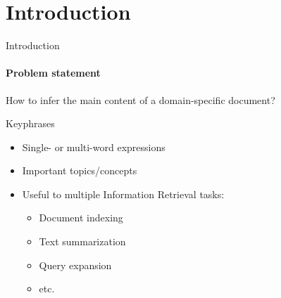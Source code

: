 \section*{Introduction}
\begin{frame}{Introduction}\framesubtitle{Problem statement}
  How to infer the main content of a domain-specific document?
  
  \vspace{1em}
  
  \begin{block}{Keyphrases}
    \begin{itemize}
      \item{Single- or multi-word expressions}
      \item{Important topics/concepts}
      \item{Useful to multiple Information Retrieval tasks:}
      \begin{itemize}
        \item{Document indexing}
        \item{Text summarization}
        \item{Query expansion}
        \item{etc.}
      \end{itemize}
    \end{itemize}
  \end{block}
\end{frame}


